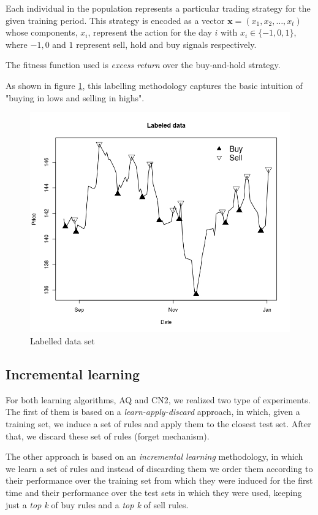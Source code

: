 \documentclass[preprint,3p,twocolumn]{elsarticle}
\begin{document}
Each individual in the population represents a particular trading strategy for the given training period. This strategy is encoded as a vector $\mathbf{x} = \left(x_1, x_2, \ldots, x_t \right)$ whose components, $x_{i}$, represent the action for the day $i$ with $ x_{i} \in \{-1,0,1 \}$, where $-1,0$ and $1$ represent sell, hold and buy signals respectively. 

The fitness function used is \textit{excess return} over the buy-and-hold strategy.

As shown in figure \ref{figure:Labelling}, this labelling methodology captures the basic intuition of "buying in lows and selling in highs".

\begin{figure}[h]
\centering\includegraphics[width=1\linewidth]{images/labelling.jpeg}
\caption{\label{figure:Labelling} Labelled data set}
\end{figure}

\subsection{Incremental learning}
For both learning algorithms, AQ and CN2, we realized two type of experiments. The first of them is based on a \textit{learn-apply-discard} approach, in which, given a training set, we induce a set of rules and apply them to the closest test set. After that, we discard these set of rules (forget mechanism).

The other approach is based on an \textit{incremental learning} methodology, in which we learn a set of rules and instead of discarding them we order them according to their performance over the training set from which they were induced for the first time and their performance over the test sets in which they were used, keeping just a \textit{top k} of buy rules and a \textit{top k} of sell rules.
\end{document}
